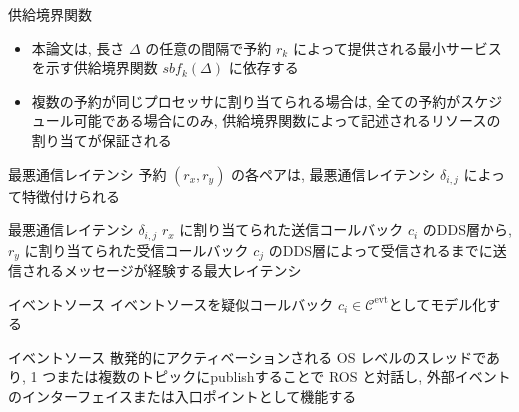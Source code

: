 \begin{frame}{供給境界関数}
    \begin{itemize}
        \item 本論文は, 長さ $\Delta$ の任意の間隔で予約 $r_{k}$ によって提供される最小サービスを示す供給境界関数 $sbf_{k}(\Delta)$ \cite{lipari2003resource, shin2003periodic} に依存する
        \item 複数の予約が同じプロセッサに割り当てられる場合は, 全ての予約がスケジュール可能である場合にのみ, 供給境界関数によって記述されるリソースの割り当てが保証される
    \end{itemize}
\end{frame}

\begin{frame}{最悪通信レイテンシ}
    予約 $\left(r_{x}, r_{y}\right)$ の各ペアは, 最悪通信レイテンシ $\delta_{i, j}$ によって特徴付けられる
    \begin{block}{最悪通信レイテンシ $\delta_{i, j}$}
        $r_x$ に割り当てられた送信コールバック $c_i$ のDDS層から, $r_y$ に割り当てられた受信コールバック $c_j$ のDDS層によって受信されるまでに送信されるメッセージが経験する最大レイテンシ
    \end{block}
\end{frame}

\begin{frame}{イベントソース}
    イベントソースを疑似コールバック $c_{i} \in \mathcal{C}^{\text {evt}}$としてモデル化する
    \begin{block}{イベントソース}
        散発的にアクティベーションされる OS レベルのスレッドであり, 1 つまたは複数のトピックにpublishすることで ROS と対話し, 外部イベントのインターフェイスまたは入口ポイントとして機能する
    \end{block}
\end{frame}
